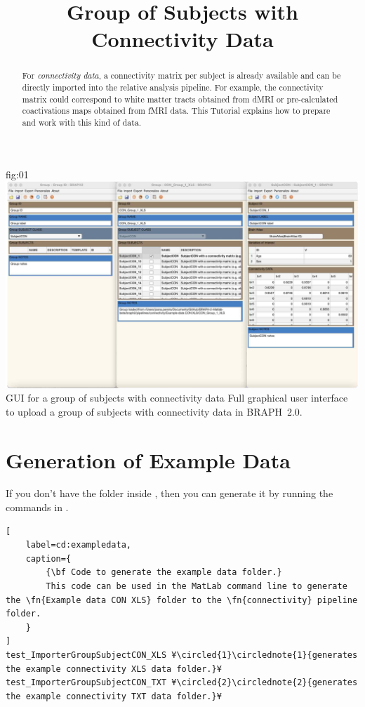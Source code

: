 \documentclass[justified]{tufte-handout}
\title{Group of Subjects with Connectivity Data}
\begin{document}
\maketitle

\begin{abstract}
\noindent
For \emph{connectivity data}, a connectivity matrix per subject is already available and can be directly imported into the relative analysis pipeline. For example, the connectivity matrix could correspond to white matter tracts obtained from dMRI or pre-calculated coactivations maps obtained from fMRI data.
This Tutorial explains how to prepare and work with this kind of data.
\end{abstract}

\tableofcontents

	{fig:01}
	{\includegraphics{fig01.jpg}}
	{GUI for a group of subjects with connectivity data}
	{
	Full graphical user interface to upload a group of subjects with connectivity data in BRAPH~2.0. 
	}

\clearpage
\section{Generation of Example Data}

If you don't have the  folder inside , then you can generate it by running the commands in .
%
\begin{lstlisting}[
	label=cd:exampledata,
	caption={
		{\bf Code to generate the example data folder.}
		This code can be used in the MatLab command line to generate the \fn{Example data CON XLS} folder to the \fn{connectivity} pipeline folder.
	}
]
test_ImporterGroupSubjectCON_XLS ¥\circled{1}\circlednote{1}{generates the example connectivity XLS data folder.}¥
test_ImporterGroupSubjectCON_TXT ¥\circled{2}\circlednote{2}{generates the example connectivity TXT data folder.}¥
\end{lstlisting}
\end{document}
